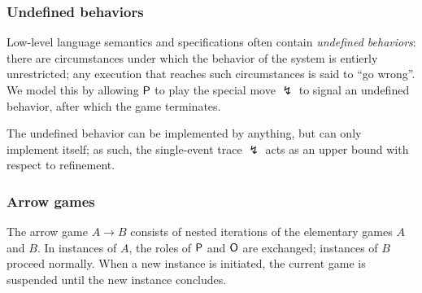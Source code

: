 
\subsubsection{Undefined behaviors} %

Low-level language semantics and specifications
often contain \emph{undefined behaviors}:
there are circumstances under which the behavior of the system
is entierly unrestricted;
any execution that reaches such circumstances is said to ``go wrong''.
We model this by allowing $ \mathsf{P} $ to play the special move
$\lightning$
to signal an undefined behavior,
after which the game terminates.

The undefined behavior can be implemented by anything,
but can only implement itself;
as such,
the single-event trace $\lightning$
acts as an upper bound with respect to refinement.


\subsubsection{Arrow games} %
\label{sec:arrow}

The arrow game $A \rightarrow B$ consists of
nested iterations of the elementary games $A$ and $B$.
In instances of $A$, the roles of $ \mathsf{P} $ and $ \mathsf{O} $ are exchanged;
instances of $B$ proceed normally.
When a new instance is initiated,
the current game is suspended
until the new instance concludes.

